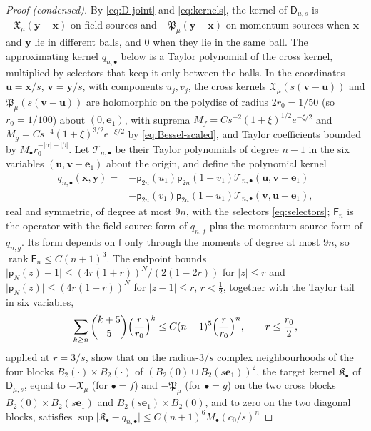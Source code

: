 \documentclass[aps,prl,reprint,longbibliography,raggedbottom]{revtex4-2}
\newcommand{\abs}[1]{\lvert #1\rvert}
\DeclareMathOperator{\rank}{rank}
\newcommand{\JointD}{\mathsf D}
\newcommand{\sx}{\mathsf f}
\newcommand{\bx}{\mathbf x}
\newcommand{\by}{\mathbf y}
\newcommand{\eone}{\mathbf e_1}
\begin{document}
\begin{proof}[Proof (condensed)]
By \eqref{eq:D-joint} and \eqref{eq:kernels}, the kernel of
$\JointD_{\mu,s}$ is $-\mathfrak X_\mu(\by-\bx)$ on field sources and
$-\mathfrak P_\mu(\by-\bx)$ on momentum sources when $\bx$ and $\by$
lie in different balls, and $0$ when they lie in the same ball. The approximating kernel $q_{n,\bullet}$ below is
a Taylor polynomial of the cross kernel, multiplied by selectors that
keep it only between the balls.
In the coordinates $\mathbf u=\bx/s$, $\mathbf v=\by/s$, with
components $u_j,v_j$, the cross kernels
$\mathfrak X_\mu(s(\mathbf v-\mathbf u))$ and
$\mathfrak P_\mu(s(\mathbf v-\mathbf u))$ are holomorphic
on the polydisc of radius $2r_0=1/50$ (so $r_0=1/100$) about
$(0,\eone)$, with suprema
$M_f=Cs^{-2}(1+\xi)^{1/2}e^{-\xi/2}$ and
$M_g=Cs^{-4}(1+\xi)^{3/2}e^{-\xi/2}$ by \eqref{eq:Bessel-scaled}, and
Taylor coefficients bounded by $M_\bullet r_0^{-\abs\alpha-\abs\beta}$.
Let $\mathcal T_{n,\bullet}$ be their Taylor polynomials of degree
$n-1$ in the six variables $(\mathbf u,\mathbf v-\eone)$ about the
origin, and define the polynomial kernel
\begin{align*}
q_{n,\bullet}(\bx,\by)={}&-\mathsf p_{2n}(u_1)\mathsf p_{2n}(1-v_1)\mathcal T_{n,\bullet}(\mathbf u,\mathbf v-\eone)\\
&-\mathsf p_{2n}(v_1)\mathsf p_{2n}(1-u_1)\mathcal T_{n,\bullet}(\mathbf v,\mathbf u-\eone),
\end{align*}
real and symmetric, of degree at most $9n$, with the selectors
\eqref{eq:selectors}; $\mathsf F_n$ is the operator with the
field-source form of $q_{n,f}$ plus the momentum-source form of
$q_{n,g}$. Its form depends on $\sx$ only through the moments of
degree at most $9n$, so $\rank\mathsf F_n\le C(n+1)^3$. The endpoint
bounds $\abs{\mathsf p_N(z)-1}\le(4r(1+r))^N/(2(1-2r))$ for
$\abs z\le r$ and $\abs{\mathsf p_N(z)}\le(4r(1+r))^N$ for
$\abs{z-1}\le r$, $r<\frac12$, together with the Taylor tail in
six variables,
\[
\sum_{k\ge n}\binom{k+5}5\Bigl(\frac r{r_0}\Bigr)^k
\le C(n+1)^5\Bigl(\frac r{r_0}\Bigr)^n,\qquad r\le\frac{r_0}2,
\]
applied at $r=3/s$, show
that on the radius-$3/s$ complex neighbourhoods of the four blocks
$B_2(\cdot)\times B_2(\cdot)$ of $(B_2(0)\cup B_2(s\eone))^2$, the
target kernel $\mathfrak K_\bullet$ of $\JointD_{\mu,s}$, equal to
$-\mathfrak X_\mu$ (for $\bullet=f$) and $-\mathfrak P_\mu$ (for
$\bullet=g$) on the two cross blocks $B_2(0)\times B_2(s\eone)$ and
$B_2(s\eone)\times B_2(0)$, and to zero on the two diagonal blocks,
satisfies
$\sup\abs{\mathfrak K_\bullet-q_{n,\bullet}}\le C(n+1)^6M_\bullet(c_0/s)^n$

\end{proof}
\end{document}
